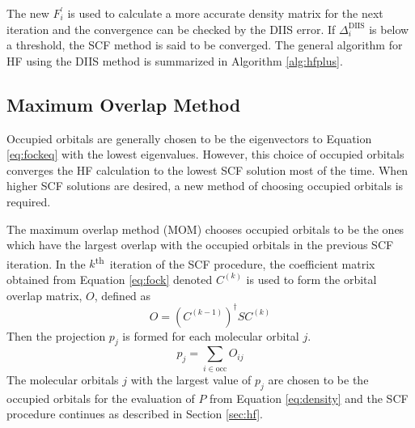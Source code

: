 \documentclass[final,3p,times,twocolumn]{elsarticle}
\newcommand{\ssth}{\textsuperscript{th}}
\begin{document}
The new $F_i^\prime$ is used to calculate a more accurate density matrix for the next iteration and the convergence can be checked by the DIIS error. If $\Delta_i^{\text{DIIS}}$ is below a threshold, the SCF method is said to be converged. The general algorithm for HF using the DIIS method is summarized in Algorithm \ref{alg:hfplus}.

\subsection{Maximum Overlap Method} \label{sec:mom}
Occupied orbitals are generally chosen to be the eigenvectors to Equation \eqref{eq:fockeq} with the lowest eigenvalues. However, this choice of occupied orbitals converges the HF calculation to the lowest SCF solution most of the time. When higher SCF solutions are desired, a new method of choosing occupied orbitals is required.

The maximum overlap method (MOM) chooses occupied orbitals to be the ones which have the largest overlap with the occupied orbitals in the previous SCF iteration. In the $k$\ssth\ iteration of the SCF procedure, the coefficient matrix obtained from Equation \eqref{eq:fock} denoted $C^{(k)}$ is used to form the orbital overlap matrix, $O$, defined as
\begin{equation} \label{eq:momoverlap}
O = (C^{(k-1)})^\dagger S C^{(k)}
\end{equation}
Then the projection $p_j$ is formed for each molecular orbital $j$.
\begin{equation} \label{eq:momproj}
p_j = \sum_{i \in \text{occ}} O_{ij}
\end{equation}
The molecular orbitals $j$ with the largest value of $p_j$ are chosen to be the occupied orbitals for the evaluation of $P$ from Equation \eqref{eq:density} and the SCF procedure continues as described in Section \ref{sec:hf}.
\end{document}
